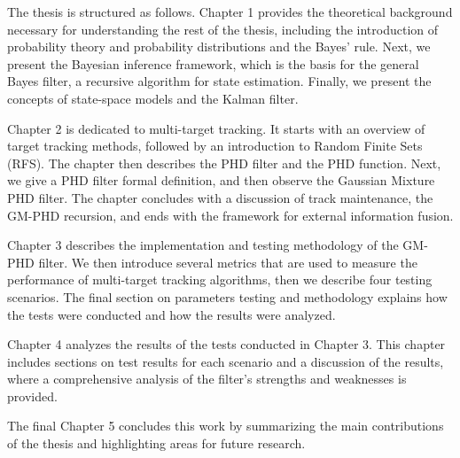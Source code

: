 The thesis is structured as follows. Chapter 1 provides the theoretical background necessary for understanding the rest of the thesis, including the introduction of probability theory and probability distributions and the Bayes' rule. Next, we present the Bayesian inference framework, which is the basis for the general Bayes filter, a recursive algorithm for state estimation. Finally, we present the concepts of state-space models and the Kalman filter.

Chapter 2 is dedicated to multi-target tracking. It starts with an overview of target tracking methods, followed by an introduction to Random Finite Sets (RFS). The chapter then describes the PHD filter and the PHD function. Next, we give a PHD filter formal definition, and then observe the Gaussian Mixture PHD filter. The chapter concludes with a discussion of track maintenance, the GM-PHD recursion, and ends with the framework for external information fusion.

Chapter 3 describes the implementation and testing methodology of the GM-PHD filter. We then introduce several metrics that are used to measure the performance of multi-target tracking algorithms, then we describe four testing scenarios. The final section on parameters testing and methodology explains how the tests were conducted and how the results were analyzed.

Chapter 4 analyzes the results of the tests conducted in Chapter 3. This chapter includes sections on test results for each scenario and a discussion of the results, where a comprehensive analysis of the filter's strengths and weaknesses is provided.

The final Chapter 5 concludes this work by summarizing the main contributions of the thesis and highlighting areas for future research.
